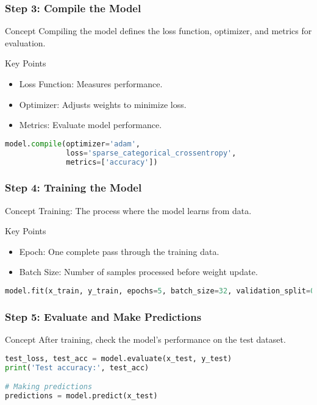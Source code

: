 \documentclass[aspectratio=169]{beamer}
\begin{document}
\begin{frame}[fragile]
    \frametitle{Step 3: Compile the Model}
    \begin{block}{Concept}
        Compiling the model defines the loss function, optimizer, and metrics for evaluation.
    \end{block}
    \begin{block}{Key Points}
        \begin{itemize}
            \item Loss Function: Measures performance.
            \item Optimizer: Adjusts weights to minimize loss.
            \item Metrics: Evaluate model performance.
        \end{itemize}
    \end{block}
    \begin{lstlisting}[language=Python]
model.compile(optimizer='adam',
              loss='sparse_categorical_crossentropy',
              metrics=['accuracy'])
    \end{lstlisting}
\end{frame}

\begin{frame}[fragile]
    \frametitle{Step 4: Training the Model}
    \begin{block}{Concept}
        Training: The process where the model learns from data.
    \end{block}
    \begin{block}{Key Points}
        \begin{itemize}
            \item Epoch: One complete pass through the training data.
            \item Batch Size: Number of samples processed before weight update.
        \end{itemize}
    \end{block}
    \begin{lstlisting}[language=Python]
model.fit(x_train, y_train, epochs=5, batch_size=32, validation_split=0.1)
    \end{lstlisting}
\end{frame}

\begin{frame}[fragile]
    \frametitle{Step 5: Evaluate and Make Predictions}
    \begin{block}{Concept}
        After training, check the model’s performance on the test dataset.
    \end{block}
    \begin{lstlisting}[language=Python]
test_loss, test_acc = model.evaluate(x_test, y_test)
print('Test accuracy:', test_acc)

# Making predictions
predictions = model.predict(x_test)
    \end{lstlisting}
\end{frame}
\end{document}
